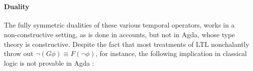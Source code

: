 \documentclass{article}
\begin{document}
\begin{code}
\AgdaSymbol{(}\AgdaSpace{}%
\AgdaSymbol{(}\AgdaSpace{}%
\AgdaSymbol{)}\AgdaSpace{}%
\AgdaSymbol{(}\AgdaSpace{}%
\AgdaSymbol{)}\AgdaSpace{}%
\AgdaSymbol{)}\AgdaSpace{}%
\AgdaSpace{}%
\AgdaSpace{}%
\AgdaSymbol{(}\AgdaSpace{}%
\AgdaSymbol{)}\AgdaSpace{}%
\<%
\\
%
\>[2]\AgdaSpace{}%
\AgdaSpace{}%
\AgdaSymbol{(}\AgdaSpace{}%
\AgdaSpace{}%
\AgdaSymbol{)}\AgdaSpace{}%
\AgdaSymbol{=}\AgdaSpace{}%
\AgdaSpace{}%
\AgdaSymbol{(}\AgdaSpace{}%
\AgdaSymbol{)}\AgdaSpace{}%
\AgdaSymbol{(}\AgdaSpace{}%
\AgdaSymbol{)}\AgdaSpace{}%
\AgdaSpace{}%
\AgdaSpace{}%
\AgdaSpace{}%
\AgdaSymbol{(}\AgdaSpace{}%
\AgdaSymbol{)}\AgdaSpace{}%
\<%
\end{code}

\paragraph{Duality}

The fully symmetric dualities of these various temporal operators, works in a
non-constructive setting, as is done in accounts, but not in Agda, whose type
theory is constructive. Despite the fact that most treatments of LTL
nonchalantly throw out $\neg (G\phi) \equiv F(\neg\phi)$, for instance, the
following implication in classical logic is not provable in Agda :
\end{document}
